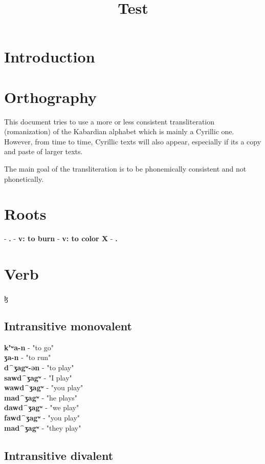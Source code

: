 \documentclass[a4paper,12pt]{book}
\title{Test}
\newcommand{\1}[1]{\textbf{\emph{#1}}} %
\newcommand{\2}[1]{\textbf{[#1]}} %
\newcommand{\3}[1]{\fontsize{11pt}{0cm}\textbf{\emph{#1}}} %
\newcommand{\4}[1]{\fontsize{10pt}{0cm}\emph{#1}}	%
\newcommand{\5}[1]{\textbf{/#1/}} %
\newcommand{\6}[1]{\textbf{[#1]}} %
\newcommand{\7}[1]{\fontsize{12pt}{0cm}\emph{#1}} %
\newcommand{\8}[1]{\fontsize{12pt}{0cm}`#1'} %
\newcommand{\9}[1]{\fontsize{12pt}{0cm}(lit. `#1')} %
\begin{document}
\frontmatter
\maketitle\newpage
\setcounter{secnumdepth}{4}
\setcounter{tocdepth}{4}

\newpage
\mainmatter

\chapter{Introduction}
\chapter{Orthography}
This document tries to use a more or less consistent transliteration (romanization) of the Kabardian alphabet which is mainly a Cyrillic one. However, from time to time, Cyrillic texts will also appear, especially if its a copy and paste of larger texts.

The main goal of the transliteration is to be phonemically consistent and not phonetically.
\chapter{Roots}
 - \textbf{.}
 - \textbf{v: to burn}
 - \textbf{v: to color X}
 - \textbf{.}
\chapter{Verb}ɮ
\section{Intransitive monovalent}
\textbf{kʼʷa-n} - "to go"\\
\textbf{ʒa-n} - "to run"\\
\textbf{d⁀ʒagʷ-ən} - "to play"\\


\textbf{sawd⁀ʒagʷ} - "I play"\\
\textbf{wawd⁀ʒagʷ} - "you play"\\
\textbf{mad⁀ʒagʷ} - "he plays"\\
\textbf{dawd⁀ʒagʷ} - "we play"\\
\textbf{fawd⁀ʒagʷ} - "you play"\\
\textbf{mad⁀ʒagʷ} - "they play"\\


\section{Intransitive divalent}
\end{document}

